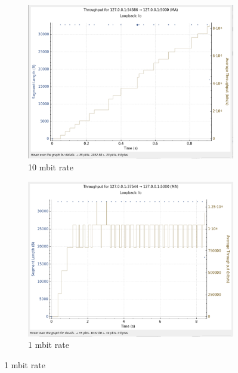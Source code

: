\documentclass{report}
\begin{document}
\begin{figure}[H]
    \centering
    \begin{subfigure}[b]{0.45\textwidth}
        \centering
        \includegraphics[width=\textwidth]{Pics/Westwood/r10mbit_s1m_th}
        \caption{10 mbit rate}
    \end{subfigure}
    \hfill
    \begin{subfigure}[b]{0.45\textwidth}
        \centering
        \includegraphics[width=\textwidth]{Pics/Westwood/r1mbit_s1m_th}
        \caption{1 mbit rate}
    \end{subfigure}
    \medskip


\end{figure}
\end{document}
